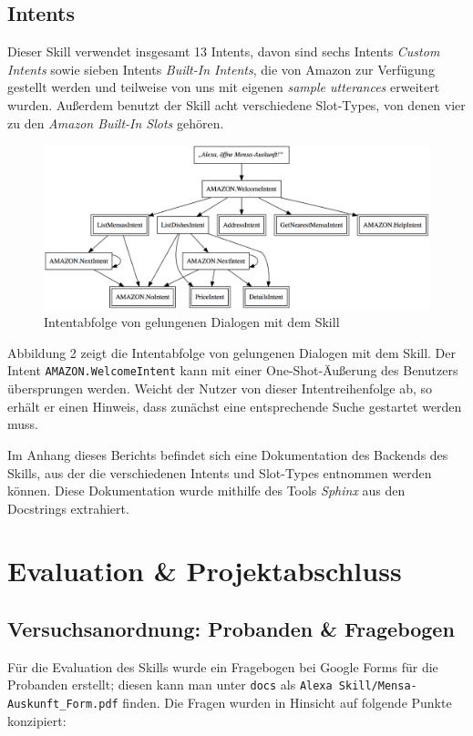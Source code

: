 \documentclass[12pt]{article}
\begin{document}
\subsection{Intents}
Dieser Skill verwendet insgesamt 13 Intents, davon sind sechs Intents \emph{Custom Intents} sowie sieben Intents \emph{Built-In Intents}, die von Amazon zur Verfügung gestellt werden und teilweise von uns mit eigenen \emph{sample utterances} erweitert wurden. 
Außerdem benutzt der Skill acht verschiedene Slot-Types, von denen vier zu den \emph{Amazon Built-In Slots} gehören.

\begin{figure}[h]
\center
\includegraphics[width=\textwidth]{intent-order.png}
\caption{Intentabfolge von gelungenen Dialogen mit dem Skill}
\end{figure}

Abbildung 2 zeigt die Intentabfolge von gelungenen Dialogen mit dem Skill.
Der Intent \texttt{AMAZON.WelcomeIntent} kann mit einer One-Shot-Äußerung des Benutzers übersprungen werden.
Weicht der Nutzer von dieser Intentreihenfolge ab, so erhält er einen Hinweis, dass zunächst eine entsprechende Suche gestartet werden muss.

Im Anhang dieses Berichts befindet sich eine Dokumentation des Backends des Skills, aus der die verschiedenen Intents und Slot-Types entnommen werden können.
Diese Dokumentation wurde mithilfe des Tools \emph{Sphinx} aus den Docstrings extrahiert.

\section{Evaluation \& Projektabschluss}
\subsection{Versuchsanordnung: Probanden \& Fragebogen}
Für die Evaluation des Skills wurde ein Fragebogen bei Google Forms für die Probanden erstellt; diesen kann man unter \texttt{docs} als \texttt{Alexa Skill/Mensa-\\Auskunft\_Form.pdf} finden. Die Fragen wurden in Hinsicht auf folgende Punkte konzipiert:
\end{document}
